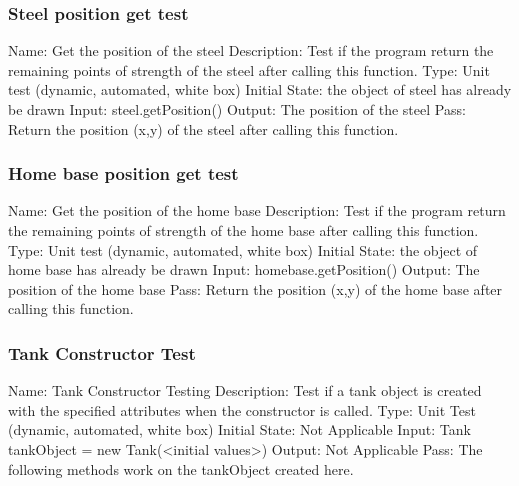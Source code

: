 \documentclass{article}
\begin{document}
\subsubsection{Steel position get test}
Name:  Get the position of the steel\newline
Description: Test if the program return the remaining points of strength of the steel after calling this function. \newline
Type: Unit test (dynamic, automated, white box) \newline
Initial State:  the object of steel has already be drawn\newline
Input: steel.getPosition()\newline
Output: The position of the steel\newline
Pass:  Return the position (x,y) of the steel after calling this function. \newline

\subsubsection{Home base position get test}
Name:  Get the position of the home base\newline
Description: Test if the program return the remaining points of strength of the home base after calling this function. \newline
Type: Unit test (dynamic, automated, white box) \newline
Initial State:  the object of home base has already be drawn\newline
Input: homebase.getPosition()\newline
Output: The position of the home base\newline
Pass:  Return the position (x,y) of the home base after calling this function. \newline

\subsubsection{Tank Constructor Test}
Name: Tank Constructor Testing\newline
Description: Test if a tank object is created with the specified attributes when the constructor is called.\newline
Type: Unit Test (dynamic, automated, white box)\newline
Initial State: Not Applicable\newline
Input: Tank tankObject = new Tank(<initial values>)\newline
Output: Not Applicable \newline
Pass: The following methods work on the tankObject created here.\newline
\end{document}
